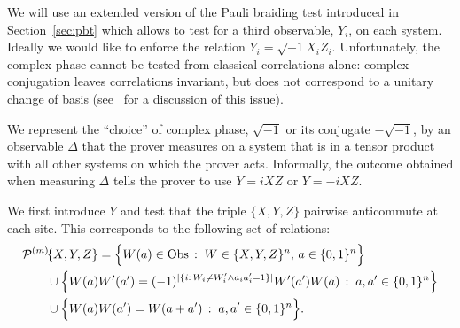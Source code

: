 We will use an extended version of the Pauli braiding test introduced in Section~\ref{sec:pbt} which allows to test for a third observable, $Y_i$, on each system. Ideally we would like to enforce the relation $Y_i=\sqrt{-1}X_iZ_i$. Unfortunately, the complex phase cannot be tested from classical correlations alone: complex conjugation leaves correlations invariant, but does not correspond to a unitary change of basis  (see~\cite[Appendix A]{reichardt2012classicalarxiv} for a discussion of this issue). 

We represent the ``choice'' of complex phase, $\sqrt{-1}$ or its conjugate $-\sqrt{-1}$, by an observable $\Delta$ that the prover measures on a system that is in a tensor product with all other systems on which the prover acts. Informally, the outcome obtained when measuring $\Delta$ tells the prover to use $Y = i XZ$ or $Y=-iXZ$. 

We first introduce $Y$ and test that the triple $\{X,Y,Z\}$ pairwise anticommute at each site. This corresponds to the following set of relations: 
\begin{align*}
& {\mathcal{P}^{(m)}\!}\{X,Y,Z\} = \Big\{ W(a)\in\mathrm{Obs}\,:\;W \in \{X,Y,Z\}^n,\,a\in\{0,1\}^n\Big\} \\
&\qquad\cup \Big\{W(a)W'(a')=(-1)^{|\{i:\,W_i\neq W'_i \wedge a_ia'_i=1\}|} W'(a')W(a)\,:\;a,a'\in\{0,1\}^n\Big\}\\
&\qquad \cup\Big\{ W(a)W(a')=W(a+a')\,:\;a,a'\in\{0,1\}^n\Big\}.
\end{align*}


